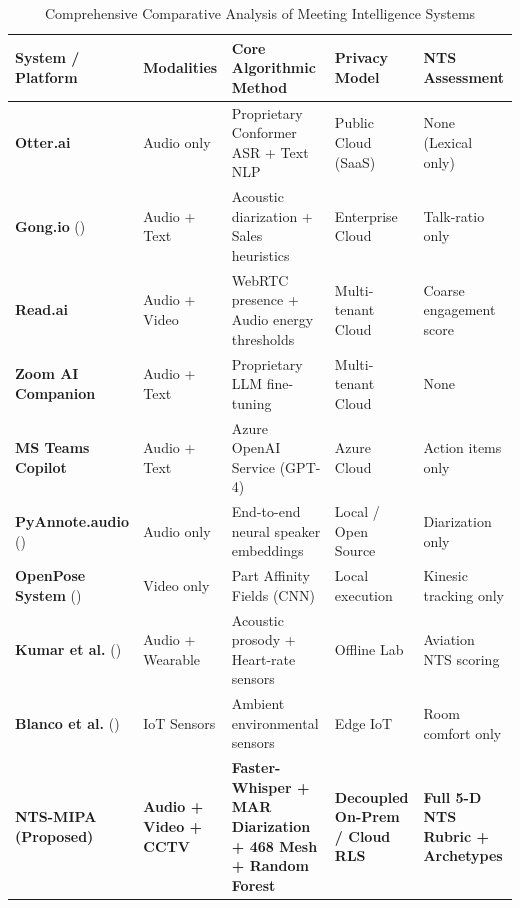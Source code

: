 \documentclass[12pt,a4paper,oneside]{report}
\providecommand{\parencite}[1]{(\cite{#1})}
\begin{document}
\begin{table}[htbp]
\centering
\caption{Comprehensive Comparative Analysis of Meeting Intelligence Systems}
\label{tab:lit_comparison}
\fontsize{9}{11}\selectfont
\begin{tabularx}{\textwidth}{@{}p{2.2cm}p{1.6cm}p{3.0cm}p{2.0cm}X@{}}
\toprule
\textbf{System / Platform} & \textbf{Modalities} & \textbf{Core Algorithmic Method} & \textbf{Privacy Model} & \textbf{NTS Assessment} \\
\midrule
\textbf{Otter.ai} & Audio only & Proprietary Conformer ASR + Text NLP & Public Cloud (SaaS) & None (Lexical only) \\
\addlinespace
\textbf{Gong.io} \parencite{gong2021revenue} & Audio + Text & Acoustic diarization + Sales heuristics & Enterprise Cloud & Talk-ratio only \\
\addlinespace
\textbf{Read.ai} & Audio + Video & WebRTC presence + Audio energy thresholds & Multi-tenant Cloud & Coarse engagement score \\
\addlinespace
\textbf{Zoom AI Companion} & Audio + Text & Proprietary LLM fine-tuning & Multi-tenant Cloud & None \\
\addlinespace
\textbf{MS Teams Copilot} & Audio + Text & Azure OpenAI Service (GPT-4) & Azure Cloud & Action items only \\
\addlinespace
\textbf{PyAnnote.audio} \parencite{bredin2020pyannote} & Audio only & End-to-end neural speaker embeddings & Local / Open Source & Diarization only \\
\addlinespace
\textbf{OpenPose System} \parencite{cao2017realtime} & Video only & Part Affinity Fields (CNN) & Local execution & Kinesic tracking only \\
\addlinespace
\textbf{Kumar et al.} \parencite{kumar2022nts} & Audio + Wearable & Acoustic prosody + Heart-rate sensors & Offline Lab & Aviation NTS scoring \\
\addlinespace
\textbf{Blanco et al.} \parencite{blanco2020meeting} & IoT Sensors & Ambient environmental sensors & Edge IoT & Room comfort only \\
\addlinespace
\textbf{NTS-MIPA (Proposed)} & \textbf{Audio + Video + CCTV} & \textbf{Faster-Whisper + MAR Diarization + 468 Mesh + Random Forest} & \textbf{Decoupled On-Prem / Cloud RLS} & \textbf{Full 5-D NTS Rubric + Archetypes} \\
\bottomrule
\end{tabularx}
\end{table}
\end{document}
